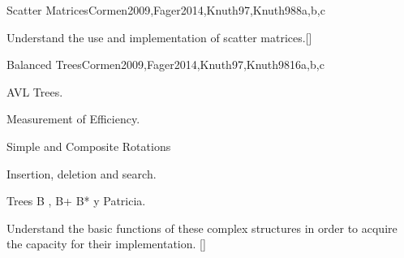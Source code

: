 \begin{syllabus}
\begin{unit}{Scatter Matrices}{}{Cormen2009,Fager2014,Knuth97,Knuth98}{8}{a,b,c}
\begin{learningoutcomes}
      \item Understand the use and implementation of scatter matrices.[\Assessment]
   \end{learningoutcomes}
\end{unit}

\begin{unit}{Balanced Trees}{}{Cormen2009,Fager2014,Knuth97,Knuth98}{16}{a,b,c}
   \begin{topics}
        \item AVL Trees.
	\item Measurement of Efficiency.
	\item Simple and Composite Rotations
	\item Insertion, deletion and search.
	\item Trees B , B+ B* y Patricia.
   \end{topics}

   \begin{learningoutcomes}
      \item Understand the basic functions of these complex structures in order to acquire the capacity for their implementation. [\Assessment]
   \end{learningoutcomes}
\end{unit}

\begin{coursebibliography}
\end{coursebibliography}

\end{syllabus}
